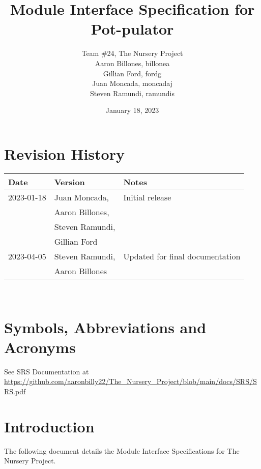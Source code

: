 \documentclass[12pt, titlepage]{article}
\begin{document}
\title{Module Interface Specification for Pot-pulator}

\author{Team \#24, The Nursery Project\\Aaron Billones, billonea\\Gillian Ford, fordg\\Juan Moncada, moncadaj\\Steven Ramundi, ramundis}
\date{January 18, 2023}

\maketitle


\section{Revision History}

\begin{tabularx}{\textwidth}{p{3cm}p{4cm}X}
  \toprule {\bf Date} & {\bf Version} & {\bf Notes}\\
  \midrule
  2023-01-18 & Juan Moncada,& Initial release\\&Aaron Billones,\\&Steven Ramundi,\\&Gillian Ford \\
  2023-04-05 & Steven Ramundi, & Updated for final documentation\\&Aaron Billones\\
  \bottomrule
  \end{tabularx}

~\newpage

\section{Symbols, Abbreviations and Acronyms}

See SRS Documentation at \url{https://github.com/aaronbilly22/The\_Nursery\_Project/blob/main/docs/SRS/SRS.pdf}


\newpage

\tableofcontents

\newpage


\section{Introduction}

The following document details the Module Interface Specifications for
The Nursery Project.
\end{document}
